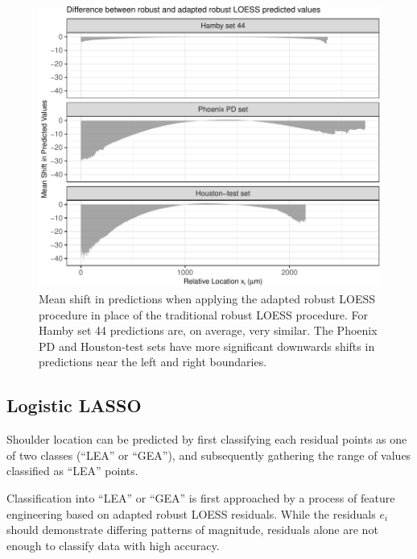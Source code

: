 \documentclass[12pt]{article}
\begin{document}
\begin{figure}
\centering
\includegraphics{writeup_files/figure-latex/adapted-rlo-shift-1.pdf}
\caption{\label{adapted-rlo-shift}Mean shift in predictions when
applying the adapted robust LOESS procedure in place of the traditional
robust LOESS procedure. For Hamby set 44 predictions are, on average,
very similar. The Phoenix PD and Houston-test sets have more significant
downwards shifts in predictions near the left and right boundaries.}
\end{figure}

\subsection{Logistic LASSO}

Shoulder location can be predicted by first classifying each residual
points as one of two classes (``LEA'' or ``GEA''), and subsequently
gathering the range of values classified as ``LEA'' points.

Classification into ``LEA'' or ``GEA'' is first approached by a process
of feature engineering based on adapted robust LOESS residuals. While
the residuals \(e_i\) should demonstrate differing patterns of
magnitude, residuals alone are not enough to classify data with high
accuracy.
\end{document}
